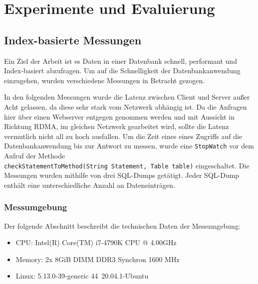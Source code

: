 \chapter{Experimente und Evaluierung}
\label{Evaluierung}
\section{Index-basierte Messungen}

Ein Ziel der Arbeit ist es Daten in einer Datenbank schnell, performant und Index-basiert abzufragen.
Um auf die Schnelligkeit der Datenbankanwendung einzugehen, wurden verschiedene Messungen in Betracht gezogen.

In den folgenden Messungen wurde die Latenz zwischen Client und Server außer Acht gelassen, da diese sehr stark vom Netzwerk abhängig ist. Da die Anfragen hier über einen Webserver entgegen genommen werden und mit Aussicht in Richtung RDMA, im gleichen Netzwerk gearbeitet wird, sollte die Latenz vermutlich nicht all zu hoch ausfallen.
Um die Zeit eines eines Zugriffs auf die Datenbankanwendung bis zur Antwort zu messen, wurde eine \texttt{StopWatch} vor dem Aufruf der Methode \\ \texttt{checkStatementToMethod(String Statement, Table table)} eingeschaltet.
Die Messungen wurden mithilfe von drei SQL-Dumps getätigt. Jeder SQL-Dump enthält eine unterschiedliche Anzahl an Dateneinträgen.

\subsection{Messumgebung}
Der folgende Abschnitt beschreibt die technischen Daten der Messumgebung:

\begin{itemize}
 \item CPU: Intel(R) Core(TM) i7-4790K CPU @ 4.00GHz
 \item Memory: 2x 8GiB DIMM DDR3 Synchron 1600 MHz
 \item Linux: 5.13.0-39-generic 44~20.04.1-Ubuntu
\end{itemize}



